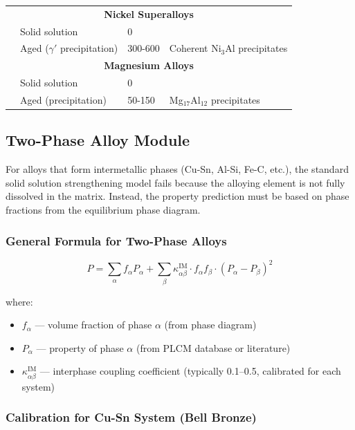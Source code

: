 \documentclass[12pt,a4paper]{article}
\begin{document}
\begin{longtable}{p{3.5cm}p{3.0cm}p{3.0cm}p{4cm}}
		\hline
		\multicolumn{4}{c}{\textbf{Nickel Superalloys}} \\
		& Solid solution & 0 & \\
		& Aged (\(\gamma'\) precipitation) & 300-600 & Coherent Ni\(_3\)Al precipitates \\
		\hline
		\multicolumn{4}{c}{\textbf{Magnesium Alloys}} \\
		& Solid solution & 0 & \\
		& Aged (precipitation) & 50-150 & Mg\(_{17}\)Al\(_{12}\) precipitates \\
		\bottomrule
	\end{longtable}
	
	\subsection{Two-Phase Alloy Module}
	\label{subsec:two-phase-alloys}
	
	For alloys that form intermetallic phases (Cu-Sn, Al-Si, Fe-C, etc.), the standard solid solution strengthening model fails because the alloying element is not fully dissolved in the matrix. Instead, the property prediction must be based on phase fractions from the equilibrium phase diagram.
	
	\subsubsection{General Formula for Two-Phase Alloys}
	
	\begin{equation}
		\boxed{P = \sum_{\alpha} f_{\alpha} P_{\alpha} + \sum_{\beta} \kappa_{\alpha\beta}^{\text{IM}} \cdot f_{\alpha} f_{\beta} \cdot (P_{\alpha} - P_{\beta})^2}
		\label{eq:two-phase-alloy}
	\end{equation}
	
	where:
	\begin{itemize}
		\item \(f_{\alpha}\) — volume fraction of phase \(\alpha\) (from phase diagram)
		\item \(P_{\alpha}\) — property of phase \(\alpha\) (from PLCM database or literature)
		\item \(\kappa_{\alpha\beta}^{\text{IM}}\) — interphase coupling coefficient (typically 0.1--0.5, calibrated for each system)
	\end{itemize}
	
	\subsubsection{Calibration for Cu-Sn System (Bell Bronze)}
	
\end{document}
